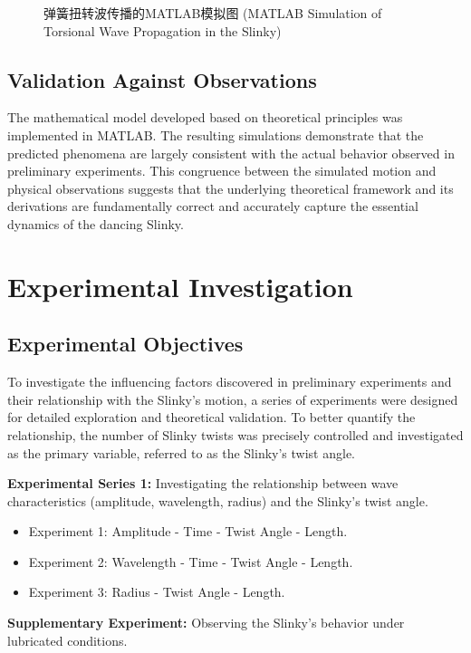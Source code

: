 \documentclass{mcmthesis}  %
\begin{document}
\begin{figure}[h!]
    \centering
    \caption{弹簧扭转波传播的MATLAB模拟图 (MATLAB Simulation of Torsional Wave Propagation in the Slinky)}
    \label{fig:matlab_simulation}
\end{figure}

\subsection{Validation Against Observations}
The mathematical model developed based on theoretical principles was implemented in MATLAB. The resulting simulations demonstrate that the predicted phenomena are largely consistent with the actual behavior observed in preliminary experiments. This congruence between the simulated motion and physical observations suggests that the underlying theoretical framework and its derivations are fundamentally correct and accurately capture the essential dynamics of the dancing Slinky.

\section{Experimental Investigation}

\subsection{Experimental Objectives}
To investigate the influencing factors discovered in preliminary experiments and their relationship with the Slinky's motion, a series of experiments were designed for detailed exploration and theoretical validation. To better quantify the relationship, the number of Slinky twists was precisely controlled and investigated as the primary variable, referred to as the Slinky's twist angle.

\textbf{Experimental Series 1:} Investigating the relationship between wave characteristics (amplitude, wavelength, radius) and the Slinky's twist angle.
\begin{itemize}
    \item Experiment 1: Amplitude - Time - Twist Angle - Length.
    \item Experiment 2: Wavelength - Time - Twist Angle - Length.
    \item Experiment 3: Radius - Twist Angle - Length.
\end{itemize}

\textbf{Supplementary Experiment:} Observing the Slinky's behavior under lubricated conditions.
\end{document}
